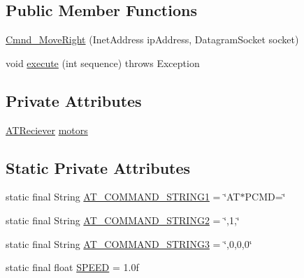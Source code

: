 \subsection*{Public Member Functions}
\begin{DoxyCompactItemize}
\item 
\hyperlink{class_drone_1_1_drone_commands_1_1_cmnd___move_right_a04a36fb2e25fb0abff87fba26939c12c}{Cmnd\+\_\+\+Move\+Right} (Inet\+Address ip\+Address, Datagram\+Socket socket)
\item 
void \hyperlink{class_drone_1_1_drone_commands_1_1_cmnd___move_right_aa7f5e79ac7f1c07cbff191f0f91d7219}{execute} (int sequence)  throws Exception  	
\end{DoxyCompactItemize}
\subsection*{Private Attributes}
\begin{DoxyCompactItemize}
\item 
\hyperlink{class_drone_1_1_hardware_1_1_a_t_reciever}{A\+T\+Reciever} \hyperlink{class_drone_1_1_drone_commands_1_1_cmnd___move_right_aca0fa5bb4d8bf88a06b0b719c926cc11}{motors}
\end{DoxyCompactItemize}
\subsection*{Static Private Attributes}
\begin{DoxyCompactItemize}
\item 
static final String \hyperlink{class_drone_1_1_drone_commands_1_1_cmnd___move_right_a944fff0aedaa2dcdbf767cf3c259db12}{A\+T\+\_\+\+C\+O\+M\+M\+A\+N\+D\+\_\+\+S\+T\+R\+I\+N\+G1} = \char`\"{}A\+T$\ast$P\+C\+M\+D=\char`\"{}
\item 
static final String \hyperlink{class_drone_1_1_drone_commands_1_1_cmnd___move_right_acf6654e93e4894b2651bf054a6ad0621}{A\+T\+\_\+\+C\+O\+M\+M\+A\+N\+D\+\_\+\+S\+T\+R\+I\+N\+G2} = \char`\"{},1,\char`\"{}
\item 
static final String \hyperlink{class_drone_1_1_drone_commands_1_1_cmnd___move_right_a45d9d1ca0c527f3d1fd275e6d5c9457e}{A\+T\+\_\+\+C\+O\+M\+M\+A\+N\+D\+\_\+\+S\+T\+R\+I\+N\+G3} = \char`\"{},0,0,0\char`\"{}
\item 
static final float \hyperlink{class_drone_1_1_drone_commands_1_1_cmnd___move_right_ad24d6f9b6f2c1899b80c9cc90941d8e2}{S\+P\+E\+E\+D} = 1.\+0f
\end{DoxyCompactItemize}


